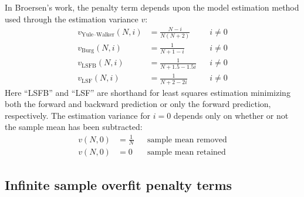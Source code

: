 \documentclass[12pt,letterpaper]{article}
\begin{document}
In Broersen's work, the penalty term depends upon the model estimation
method used through the estimation variance $v$:
\begin{subequations}
\label{eq:v1}
\begin{align}
    v_\text{Yule--Walker}\!\left(N,i\right) &= \frac{N-i}{N\left(N+2\right)}
    &
    &i \neq 0
    \\
    v_\text{Burg}\!\left(N,i\right) &= \frac{1}{N + 1 - i}
    &
    &i \neq 0
    \\
    v_\text{LSFB}\!\left(N,i\right) &= \frac{1}{N + 1.5 - 1.5i}
    &
    &i \neq 0
    \\
    v_\text{LSF}\!\left(N,i\right)  &= \frac{1}{N + 2 - 2i}
    &
    &i \neq 0
\end{align}
\end{subequations}
Here ``LSFB'' and ``LSF'' are shorthand for least squares estimation minimizing
both the forward and backward prediction or only the forward prediction,
respectively.  The estimation variance for $i=0$ depends only on whether or not
the sample mean has been subtracted:
\begin{subequations}
\label{eq:v0}
\begin{align}
    v\!\left(N,0\right) &= \frac{1}{N}
    &
    &\text{sample mean removed}
    \\
    v\!\left(N,0\right) &= 0
    &
    &\text{sample mean retained}
\end{align}
\end{subequations}

\subsection*{Infinite sample overfit penalty terms}
\end{document}
